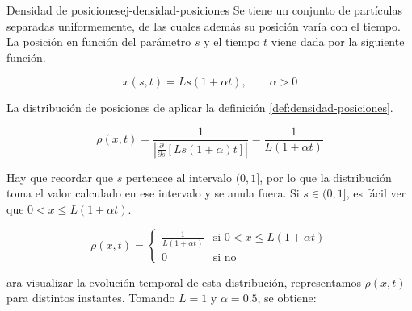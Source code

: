 \newpage
\begin{ejemplo}{Densidad de posiciones}{ej-densidad-posiciones}
Se tiene un conjunto de partículas separadas uniformemente, de las cuales además su posición varía con el tiempo. La posición en función del parámetro $s$ y el tiempo $t$ viene dada por la siguiente función.

\[x(s,t)=Ls(1+\alpha t), \qquad \alpha>0\]

La distribución de posiciones de aplicar la definición \ref{def:densidad-posiciones}.

\[\rho(x,t)=\frac{1}{\left|\frac{\partial}{\partial s}\left[Ls(1+\alpha)t\right]\right|}=\frac{1}{L(1+\alpha t)}\]

Hay que recordar que $s$ pertenece al intervalo $(0,1]$, por lo que la distribución toma el valor calculado en ese intervalo y se anula fuera. Si $s\in(0,1]$, es fácil ver que $0<x\leq L(1+\alpha t)$.

\[\rho(x,t)=
\begin{cases}
    \frac{1}{L(1+\alpha t)} & \text{si } 0<x\leq L(1+\alpha t) \\
    0 & \text{si no} 
\end{cases}
\]

ara visualizar la evolución temporal de esta distribución, representamos
$\rho(x,t)$ para distintos instantes. Tomando $L=1$ y $\alpha=0.5$,
se obtiene:

\begin{center}
\end{center}
\end{ejemplo}
